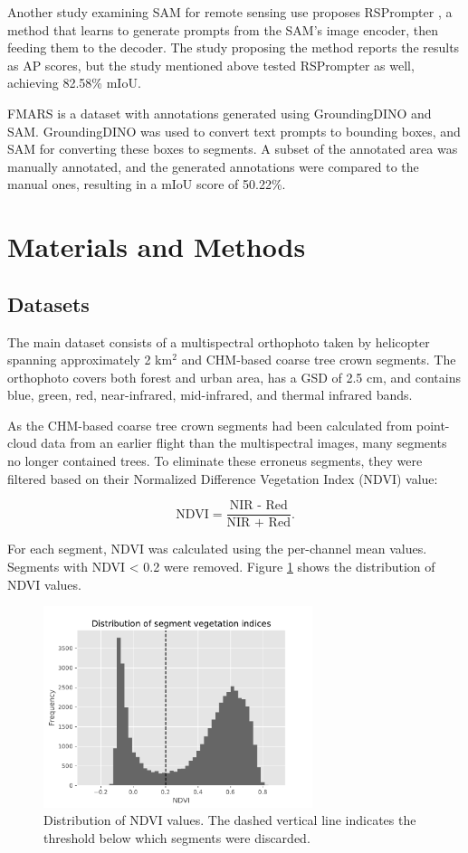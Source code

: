 \documentclass[english, 12pt, a4paper, sci, utf8, a-2b, online]{aaltothesis}
\begin{document}
Another study examining SAM for remote sensing use proposes RSPrompter \cite{rsprompter}, a method that learns to generate prompts from the SAM's image encoder, then feeding them to the decoder. The study proposing the method reports the results as AP scores, but the study mentioned above tested RSPrompter as well, achieving 82.58\% mIoU. \cite{sam-treecrown}

FMARS \cite{fmars} is a dataset with annotations generated using GroundingDINO and SAM. GroundingDINO was used to convert text prompts to bounding boxes, and SAM for converting these boxes to segments. A subset of the annotated area was manually annotated, and the generated annotations were compared to the manual ones, resulting in a mIoU score of 50.22\%.

\newpage
\section{Materials and Methods}

\subsection{Datasets}

The main dataset consists of a multispectral orthophoto taken by helicopter spanning approximately 2 km$^2$ and CHM-based coarse tree crown segments. The orthophoto covers both forest and urban area, has a GSD of 2.5 cm, and contains blue, green, red, near-infrared, mid-infrared, and thermal infrared bands.

As the CHM-based coarse tree crown segments had been calculated from point-cloud data from an earlier flight than the multispectral images, many segments no longer contained trees. To eliminate these erroneus segments, they were filtered based on their Normalized Difference Vegetation Index (NDVI) value:

$$
\text{NDVI} = \frac{\text{NIR - Red}}{\text{NIR + Red}}.
$$

For each segment, NDVI was calculated using the per-channel mean values. Segments with NDVI < 0.2 were removed. Figure \ref{fig:ndvi} shows the distribution of NDVI values.

\begin{figure}[h]
    \centering
    \includegraphics[width=0.7\textwidth]{figures/ndvi.pdf}
    \caption{Distribution of NDVI values. The dashed vertical line indicates the threshold below which segments were discarded.}
    \label{fig:ndvi}
\end{figure}
\end{document}
